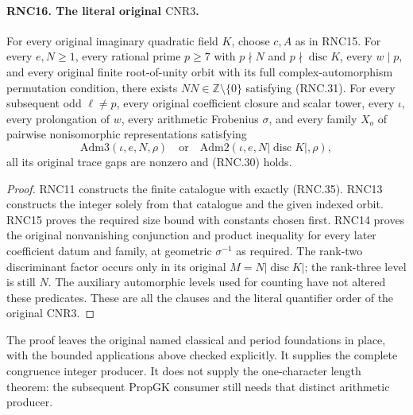 \paragraph{RNC16. The literal original $\mathrm{CNR3}$.}
\label{claim:RNC16}
For every original imaginary quadratic field $K$, choose
$c,A$ as in RNC15.  For every $e,N\geq1$, every rational
prime $p\geq7$ with $p\nmid N$ and
$p\nmid\operatorname{disc}K$, every $w\mid p$, and
every original finite root-of-unity orbit with its
full complex-automorphism permutation condition, there
exists $NN\in\mathbb Z\setminus\{0\}$ satisfying
(RNC.31).  For every subsequent odd $\ell\ne p$,
every original coefficient closure and scalar tower,
every $\iota$, every prolongation of $w$, every
arithmetic Frobenius $\sigma$, and every family
$X_o$ of pairwise nonisomorphic representations satisfying
\[
 \mathrm{Adm3}(\iota,e,N,\rho)
          \quad\text{or}\quad
 \mathrm{Adm2}(\iota,e,N|\operatorname{disc}K|,\rho),
                                                               \tag{RNC.35}
\]
all its original trace gaps are nonzero and (RNC.30) holds.
\begin{proof}
RNC11 constructs the finite catalogue with exactly
(RNC.35).  RNC13 constructs the integer solely from that
catalogue and the given indexed orbit.  RNC15 proves the
required size bound with constants chosen first.
RNC14 proves the original nonvanishing conjunction and
product inequality for every later coefficient datum
and family, at geometric $\sigma^{-1}$ as required.
The rank-two discriminant factor occurs only in its
original $M=N|\operatorname{disc}K|$; the rank-three
level is still $N$.  The auxiliary automorphic levels
used for counting have not altered these predicates.
These are all the clauses and the literal quantifier
order of the original $\mathrm{CNR3}$.
\end{proof}

The proof leaves the original named classical and period
foundations in place, with the bounded applications above
checked explicitly.  It supplies the complete congruence
integer producer.  It does not supply the one-character
length theorem: the subsequent $\mathrm{PropGK}$ consumer
still needs that distinct arithmetic producer.
